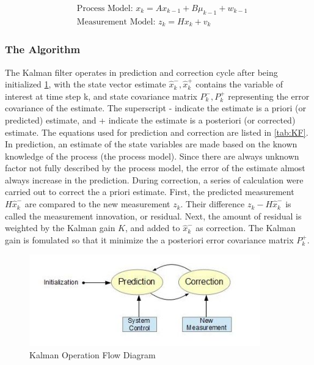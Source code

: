\begin{align}
&\text{Process Model: }x_k = Ax_{k-1}+B\mu_{k-1}+w_{k-1}\\
&\text{Measurement Model: }z_k = Hx_k+v_k
\end{align}

\subsubsection{The Algorithm}
The Kalman filter operates in prediction and correction cycle after
being initialized \ref{figch2:1}, with the state vector estimate
$\hat{x}^-_k, \hat{x}^+_k$ contains the variable of interest at time
step k, and state covariance matrix $P^-_k, P^+_k$ representing the
error covariance of the estimate. The superscript - indicate the
estimate is a priori (or predicted) estimate, and + indicate the
estimate is a posteriori (or corrected) estimate. The equations used
for prediction and correction are listed in \ref{tab:KF}. In
prediction, an estimate of the state variables are made based on the
known knowledge of the process (the process model). Since there are
always unknown factor not fully described by the process model, the
error of the estimate almost always increase in the prediction. During
correction, a series of calculation were carried out to correct the a
priori estimate. First, the predicted measurement $H\hat{x}^-_k$ are
compared to the new measurement $z_k$. Their difference $z_k -
H\hat{x}^-_k$ is called the measurement innovation, or residual. Next,
the amount of residual is weighted by the Kalman gain $K$, and added
to $\hat{x}^-_k$ as correction. The Kalman gain is fomulated so that
it minimize the a posteriori error covariance matrix $P^+_k$. 

\begin{figure}[h]
\centering
\includegraphics[width=10cm, keepaspectratio=true]{./Figures/KalmanOperation.jpg}
\caption{Kalman Operation Flow Diagram}
\label{figch2:1}
\end{figure}

